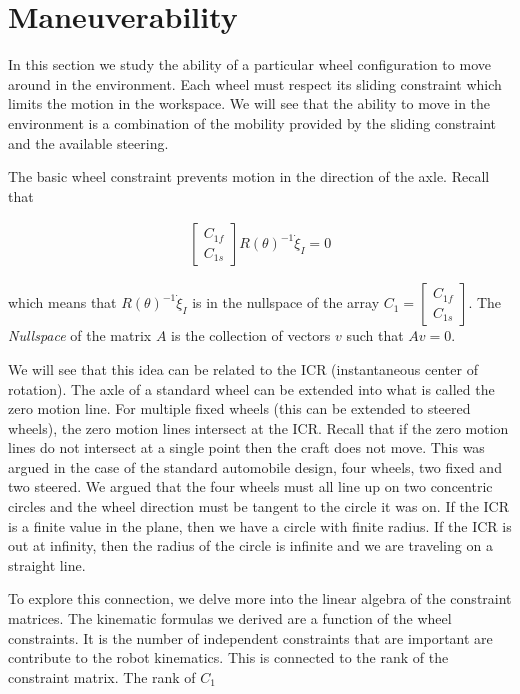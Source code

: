 \hypertarget{maneuverability}{%
\section{Maneuverability}\label{maneuverability}}

In this section we study the ability of a particular wheel configuration
to move around in the environment. Each wheel must respect its sliding
constraint which limits the motion in the workspace. We will see that
the ability to move in the environment is a combination of the mobility
provided by the sliding constraint and the available steering.

The basic wheel constraint prevents motion in the direction of the axle.
Recall that

\[\begin{aligned}
\begin{bmatrix} C_{1f} \\ C_{1s} \end{bmatrix}R(\theta)^{-1}\dot{\xi}_I = 0
\end{aligned}\]

which means that \(R(\theta)^{-1}\dot{\xi}_I\) is in the nullspace of
the array \(C_1 = \begin{bmatrix} C_{1f} \\ C_{1s} \end{bmatrix}\). The
\emph{Nullspace} of the matrix \(A\) is the collection of vectors \(v\)
such that \(Av=0\).

We will see that this idea can be related to the ICR (instantaneous
center of rotation). The axle of a standard wheel can be extended into
what is called the zero motion line. For multiple fixed wheels (this can
be extended to steered wheels), the zero motion lines intersect at the
ICR. Recall that if the zero motion lines do not intersect at a single
point then the craft does not move. This was argued in the case of the
standard automobile design, four wheels, two fixed and two steered. We
argued that the four wheels must all line up on two concentric circles
and the wheel direction must be tangent to the circle it was on. If the
ICR is a finite value in the plane, then we have a circle with finite
radius. If the ICR is out at infinity, then the radius of the circle is
infinite and we are traveling on a straight line.

To explore this connection, we delve more into the linear algebra of the
constraint matrices. The kinematic formulas we derived are a function of
the wheel constraints. It is the number of independent constraints that
are important are contribute to the robot kinematics. This is connected
to the rank of the constraint matrix. The rank of \(C_1\)

